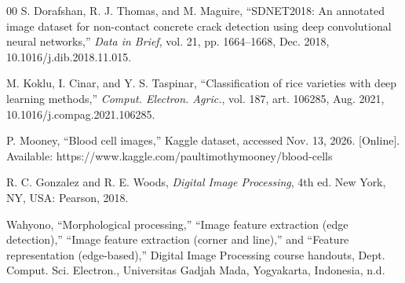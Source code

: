 \documentclass{ieeeaccess}
\begin{document}
\begin{thebibliography}{00}
 S. Dorafshan, R. J. Thomas, and M. Maguire,
``SDNET2018: An annotated image dataset for non-contact concrete crack detection
using deep convolutional neural networks,'' \emph{Data in Brief}, vol. 21,
pp. 1664--1668, Dec. 2018, 10.1016/j.dib.2018.11.015.

 M. Koklu, I. Cinar, and Y. S. Taspinar, ``Classification of
rice varieties with deep learning methods,'' \emph{Comput. Electron. Agric.},
vol. 187, art. 106285, Aug. 2021, 10.1016/j.compag.2021.106285.

 P. Mooney, ``Blood cell images,'' Kaggle dataset, accessed
Nov. 13, 2026. [Online]. Available:
https://www.kaggle.com/paultimothymooney/blood-cells

 R. C. Gonzalez and R. E. Woods, \emph{Digital Image
Processing}, 4th ed. New York, NY, USA: Pearson, 2018.

 Wahyono, ``Morphological processing,'' ``Image feature
extraction (edge detection),'' ``Image feature extraction (corner and line),''
and ``Feature representation (edge-based),'' Digital Image Processing course
handouts, Dept. Comput. Sci. Electron., Universitas Gadjah Mada, Yogyakarta,
Indonesia, n.d.

\end{thebibliography}

\EOD
\end{document}
